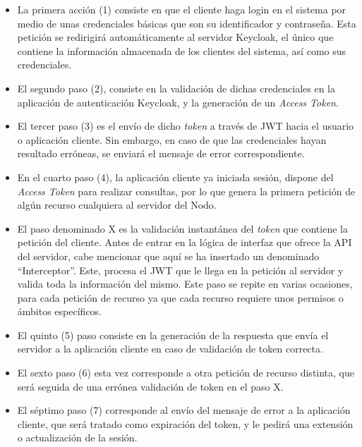 \begin{itemize}
	\item La primera acción (1) consiste en que el cliente haga login en el sistema por medio de unas credenciales básicas que son su identificador y contraseña. Esta petición se redirigirá automáticamente al servidor Keycloak, el único que contiene la información almacenada de los clientes del sistema, así como sus credenciales. 
	
	\item El segundo paso (2), consiste en la validación de dichas credenciales en la aplicación de autenticación Keycloak, y la generación de un \textit{Access Token}.
	
	\item El tercer paso (3) es el envío de dicho \textit{token} a través de JWT hacia el usuario o aplicación cliente. Sin embargo, en caso de que las credenciales hayan resultado erróneas, se enviará el mensaje de error correspondiente. 
	
	\item En el cuarto paso (4), la aplicación cliente ya iniciada sesión, dispone del \textit{Access Token} para realizar consultas, por lo que genera la primera petición de algún recurso cualquiera al servidor del Nodo.
	
	\item El paso denominado X es la validación instantánea del \textit{token} que contiene la petición del cliente. Antes de entrar en la lógica de interfaz que ofrece la API del servidor, cabe mencionar que aquí  se ha insertado un denominado “Interceptor”. Este, procesa el JWT que le llega en la petición al servidor y valida toda la información del mismo. Este paso se repite en varias ocasiones, para cada petición de recurso ya que cada recurso requiere unos permisos o ámbitos específicos. 
	
	\item El quinto (5) paso consiste en la generación de la respuesta que envía el servidor a la aplicación cliente en caso de validación de token correcta. 
	
	\item El sexto paso (6) esta vez corresponde a otra petición de recurso distinta, que será seguida de una errónea validación de token en el paso X.
	
	\item El séptimo paso (7) corresponde al envío del mensaje de error a la aplicación cliente, que será tratado como expiración del token, y le pedirá una extensión o actualización de la sesión. 
	

\end{itemize}
